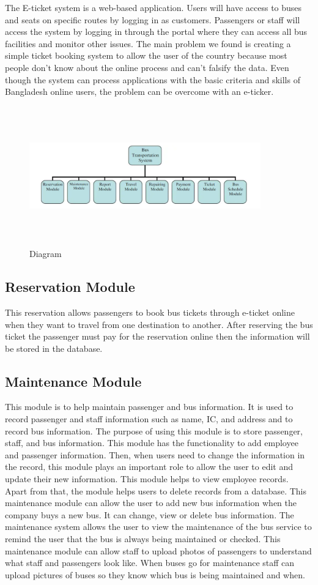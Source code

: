 \documentclass{article}
\begin{document}
The E-ticket system is a web-based application. Users will have access to buses and seats on specific routes by logging in as customers. Passengers or staff will access the system by logging in through the portal where they can access all bus facilities and monitor other issues.
The main problem we found is creating a simple ticket booking system to allow the user of the country because most people don't know about the online process and can't falsify the data. Even though the system can process applications with the basic criteria and skills of Bangladesh online users, the problem can be overcome with an e-ticker.
\begin{figure}[h]
    \centering
    \includegraphics[width=10cm,height=6cm]{img/Picture1.png}
    \caption{Diagram}
    \label{fig:my_label}
\end{figure}

\subsection{Reservation Module}
This reservation allows passengers to book bus tickets through e-ticket online when they want to travel from one destination to another. After reserving the bus ticket the passenger must pay for the reservation online then the information will be stored in the database.
\subsection{Maintenance Module}
This module is to help maintain passenger and bus information. It is used to record passenger and staff information such as name, IC, and address and to record bus information. The purpose of using this module is to store passenger, staff, and bus information. This module has the functionality to add employee and passenger information. Then, when users need to change the information in the record, this module plays an important role to allow the user to edit and update their new information. This module helps to view employee records. Apart from that, the module helps users to delete records from a database. This maintenance module can allow the user to add new bus information when the company buys a new bus. It can change, view or delete bus information. The maintenance system allows the user to view the maintenance of the bus service to remind the user that the bus is always being maintained or checked. This maintenance module can allow staff to upload photos of passengers to understand what staff and passengers look like. When buses go for maintenance staff can upload pictures of buses so they know which bus is being maintained and when.
\end{document}
